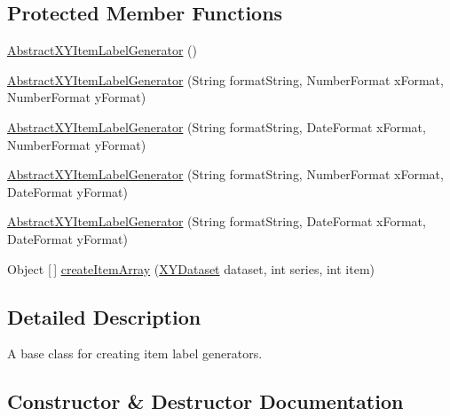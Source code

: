 \subsection*{Protected Member Functions}
\begin{DoxyCompactItemize}
\item 
\mbox{\hyperlink{classorg_1_1jfree_1_1chart_1_1labels_1_1_abstract_x_y_item_label_generator_aa18773f86b9a85dfdb4c20dcd0d303fc}{Abstract\+X\+Y\+Item\+Label\+Generator}} ()
\item 
\mbox{\hyperlink{classorg_1_1jfree_1_1chart_1_1labels_1_1_abstract_x_y_item_label_generator_aa8567f572683f09faf89cec22d1fea31}{Abstract\+X\+Y\+Item\+Label\+Generator}} (String format\+String, Number\+Format x\+Format, Number\+Format y\+Format)
\item 
\mbox{\hyperlink{classorg_1_1jfree_1_1chart_1_1labels_1_1_abstract_x_y_item_label_generator_a4d412610703c776620cc4ffb5a8e49a2}{Abstract\+X\+Y\+Item\+Label\+Generator}} (String format\+String, Date\+Format x\+Format, Number\+Format y\+Format)
\item 
\mbox{\hyperlink{classorg_1_1jfree_1_1chart_1_1labels_1_1_abstract_x_y_item_label_generator_a6e4ed5c068d6710be0ad77bbd3408a86}{Abstract\+X\+Y\+Item\+Label\+Generator}} (String format\+String, Number\+Format x\+Format, Date\+Format y\+Format)
\item 
\mbox{\hyperlink{classorg_1_1jfree_1_1chart_1_1labels_1_1_abstract_x_y_item_label_generator_aa31259f2f72237a3dae3f54ec86aa6a0}{Abstract\+X\+Y\+Item\+Label\+Generator}} (String format\+String, Date\+Format x\+Format, Date\+Format y\+Format)
\item 
Object \mbox{[}$\,$\mbox{]} \mbox{\hyperlink{classorg_1_1jfree_1_1chart_1_1labels_1_1_abstract_x_y_item_label_generator_a77dd546f6784f58fb50a6ddd237a87b3}{create\+Item\+Array}} (\mbox{\hyperlink{interfaceorg_1_1jfree_1_1data_1_1xy_1_1_x_y_dataset}{X\+Y\+Dataset}} dataset, int series, int item)
\end{DoxyCompactItemize}


\subsection{Detailed Description}
A base class for creating item label generators. 

\subsection{Constructor \& Destructor Documentation}
\mbox{\label{classorg_1_1jfree_1_1chart_1_1labels_1_1_abstract_x_y_item_label_generator_aa18773f86b9a85dfdb4c20dcd0d303fc}} 
